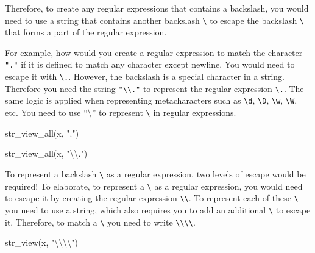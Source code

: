 \documentclass[
]{book}
\newenvironment{Shaded}{\begin{snugshade}}{\end{snugshade}}
\newcommand{\FunctionTok}[1]{\textcolor[rgb]{0.00,0.00,0.00}{#1}}
\newcommand{\NormalTok}[1]{#1}
\newcommand{\SpecialCharTok}[1]{\textcolor[rgb]{0.00,0.00,0.00}{#1}}
\newcommand{\StringTok}[1]{\textcolor[rgb]{0.31,0.60,0.02}{#1}}
\begin{document}
Therefore, to create any regular expressions that contains a backslash, you would need to use a string that contains another backslash \texttt{\textbackslash{}} to escape the backslash \texttt{\textbackslash{}} that forms a part of the regular expression.

For example, how would you create a regular expression to match the character \texttt{"."} if it is defined to match any character except newline. You would need to escape it with \texttt{\textbackslash{}.}. However, the backslash is a special character in a string. Therefore you need the string \texttt{"\textbackslash{}\textbackslash{}."} to represent the regular expression \texttt{\textbackslash{}.}. The same logic is applied when representing metacharacters such as \texttt{\textbackslash{}d}, \texttt{\textbackslash{}D}, \texttt{\textbackslash{}w}, \texttt{\textbackslash{}W}, etc. You need to use ``\textbackslash{}'' to represent \texttt{\textbackslash{}} in regular expressions.

\begin{Shaded}
\begin{Highlighting}[]
\FunctionTok{str\_view\_all}\NormalTok{(x, }\StringTok{"."}\NormalTok{)}
\end{Highlighting}
\end{Shaded}

\begin{Shaded}
\begin{Highlighting}[]
\FunctionTok{str\_view\_all}\NormalTok{(x, }\StringTok{"}\SpecialCharTok{\textbackslash{}\textbackslash{}}\StringTok{."}\NormalTok{)}
\end{Highlighting}
\end{Shaded}

To represent a backslash \texttt{\textbackslash{}} as a regular expression, two levels of escape would be required! To elaborate, to represent a \texttt{\textbackslash{}} as a regular expression, you would need to escape it by creating the regular expression \texttt{\textbackslash{}\textbackslash{}}. To represent each of these \texttt{\textbackslash{}} you need to use a string, which also requires you to add an additional \texttt{\textbackslash{}} to escape it. Therefore, to match a \texttt{\textbackslash{}} you need to write \texttt{\textbackslash{}\textbackslash{}\textbackslash{}\textbackslash{}}.

\begin{Shaded}
\begin{Highlighting}[]
\FunctionTok{str\_view}\NormalTok{(x, }\StringTok{"}\SpecialCharTok{\textbackslash{}\textbackslash{}\textbackslash{}\textbackslash{}}\StringTok{"}\NormalTok{)}
\end{Highlighting}
\end{Shaded}
\end{document}
